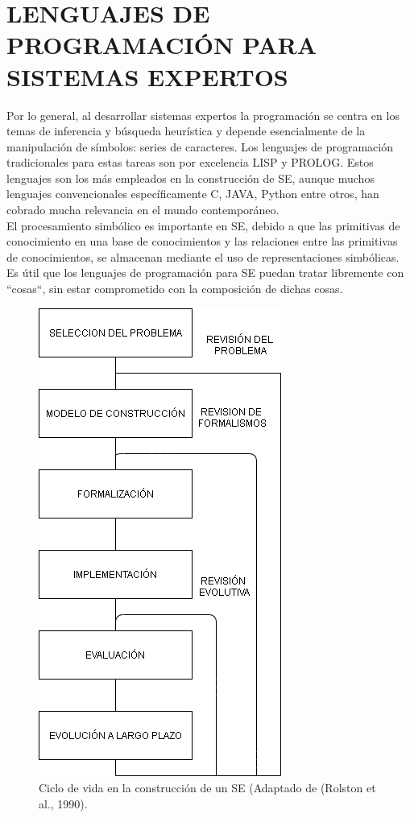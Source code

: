 \section{	LENGUAJES DE PROGRAMACIÓN PARA SISTEMAS EXPERTOS}
Por lo general, al desarrollar sistemas expertos la programación se centra en los temas de inferencia y búsqueda heurística y depende esencialmente de la manipulación de símbolos: series de caracteres. Los lenguajes de programación tradicionales para estas tareas son por excelencia LISP y PROLOG.  Estos lenguajes son los más empleados en la construcción de SE, aunque muchos lenguajes convencionales específicamente C, JAVA, Python entre otros, han cobrado mucha relevancia en el mundo contemporáneo.\\
El procesamiento simbólico es importante en SE, debido a que las primitivas de conocimiento en una base de conocimientos y las relaciones entre las primitivas de conocimientos, se almacenan mediante el uso de representaciones simbólicas. Es útil que los lenguajes de programación para SE puedan tratar libremente con ``cosas``, sin estar comprometido con la composición de dichas cosas.\\
\begin{figure}[H]
\centering
\captionsetup{justification=centering,margin=2cm}
\includegraphics[scale=0.4]{chapters/chapter10/figures/1-5}
\caption{Ciclo de vida en la construcción de un SE (Adaptado de (Rolston et al., 1990).}
\label{fig:10-5}
\end{figure}
